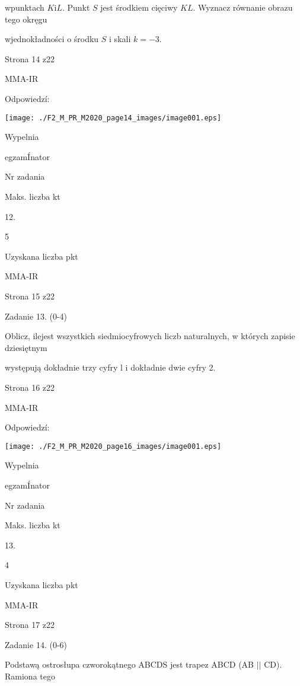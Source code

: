 \documentclass[a4paper,12pt]{article}
\begin{document}
wpunktach $K\mathrm{i}L$. Punkt $S$ jest środkiem cięciwy $KL$. Wyznacz równanie obrazu tego okręgu

wjednokładności o środku $S$ i skali $k=-3.$

Strona 14 z22

MMA-IR





Odpowiedzí:
\begin{center}
\texttt{[image: ./F2\_M\_PR\_M2020\_page14\_images/image001.eps]}
\end{center}
Wypelnia

egzamÍnator

Nr zadania

Maks. liczba kt

12.

5

Uzyskana liczba pkt

MMA-IR

Strona 15 z22





Zadanie 13. (0-4)

Oblicz, ilejest wszystkich siedmiocyfrowych liczb naturalnych, w których zapisie dziesiętnym

występują dokładnie trzy cyfry l i dokładnie dwie cyfry 2.

Strona 16 z22

MMA-IR





Odpowiedzí:
\begin{center}
\texttt{[image: ./F2\_M\_PR\_M2020\_page16\_images/image001.eps]}
\end{center}
Wypelnia

egzamÍnator

Nr zadania

Maks. liczba kt

13.

4

Uzyskana liczba pkt

MMA-IR

Strona 17 z22





Zadanie 14. (0-6)

Podstawą ostrosłupa czworokątnego ABCDS jest trapez ABCD (AB $||$ CD). Ramiona tego
\end{document}
